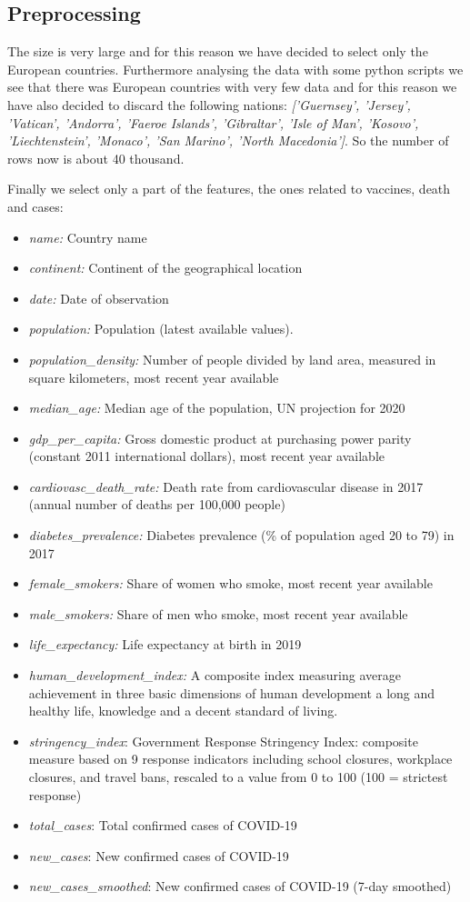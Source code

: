 \documentclass[10pt,conference]{IEEEtran}
\begin{document}
\subsection{Preprocessing}
The size is very large and for this reason we have decided to select only the European countries. Furthermore analysing the data with some python scripts we see that there was European countries with very few data and for this reason we have also decided to discard the following nations:
{\em ['Guernsey', 'Jersey', 'Vatican', 'Andorra', 'Faeroe Islands', 'Gibraltar', 'Isle of Man', 'Kosovo', 'Liechtenstein', 'Monaco', 'San Marino', 'North Macedonia']}. 
So the number of rows now is about 40 thousand. 

Finally we select only a part of the features, the ones related to vaccines, death and cases:
\begin{itemize}
		\item \emph{name:} Country name
		\item \emph{continent:} Continent of the geographical location
		\item \emph{date:} Date of observation
		
		\item \emph{population:} Population (latest available values).
		\item \emph{population\_density:} Number of people divided by land area, measured in square kilometers, most recent year available
		\item \emph{median\_age:} Median age of the population, UN projection for 2020
		\item \emph{gdp\_per\_capita:} Gross domestic product at purchasing power parity (constant 2011 international dollars), most recent year available
		\item \emph{cardiovasc\_death\_rate:} Death rate from cardiovascular disease in 2017 (annual number of deaths per 100,000 people)
		\item \emph{diabetes\_prevalence:} Diabetes prevalence (\% of population aged 20 to 79) in 2017
		\item \emph{female\_smokers:} Share of women who smoke, most recent year available
		\item \emph{male\_smokers:} Share of men who smoke, most recent year available
		\item \emph{life\_expectancy:} Life expectancy at birth in 2019
		\item \emph{human\_development\_index:} A composite index measuring average achievement in three basic dimensions of human development a long and healthy life, knowledge and a decent standard of living. 
		\item \emph{stringency\_index}: Government Response Stringency Index: composite measure based on 9 response indicators including school closures, workplace closures, and travel bans, rescaled to a value from 0 to 100 (100 = strictest response)
		\item \emph{total\_cases}: Total confirmed cases of COVID-19
		\item \emph{new\_cases}: New confirmed cases of COVID-19
		\item \emph{new\_cases\_smoothed}: New confirmed cases of COVID-19 (7-day smoothed)
	

\end{itemize}
\end{document}
